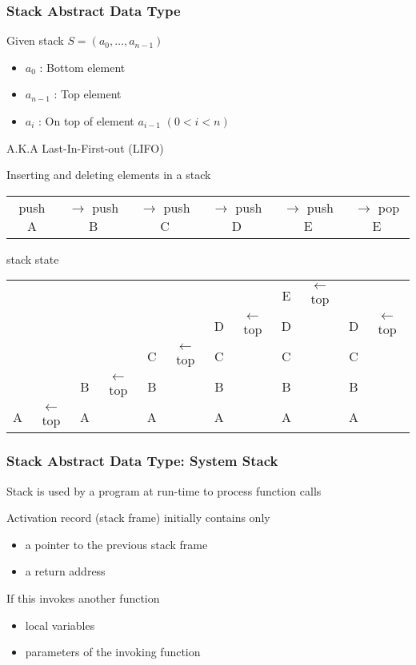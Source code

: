 \documentclass[newPxFont,sthlmFooter,nooffset]{beamer}
\begin{document}
\begin{frame}[t]
  \frametitle{Stack Abstract Data Type}
Given stack $S = ( a_0, \ldots, a_{n-1})$
\begin{itemize}
\item $a_0$ : Bottom element
\item $a_{n-1}$ : Top element
\item $a_{i}$ : On top of element $a_{i-1}$ $(0 < i < n)$
\end{itemize}

A.K.A Last-In-First-out (LIFO)

\bigskip

Inserting and deleting elements in a stack
{\footnotesize  \begin{centering}
\begin{tabular}{!{}c<{}c<{}c<{}c<{}c<{}c}
push A & $\rightarrow$ push B &  $\rightarrow$ push C &  $\rightarrow$ push D &  $\rightarrow$ push E &  $\rightarrow$ pop E \\
    \end{tabular}
  \end{centering}}

{ stack state}

{\footnotesize  \begin{centering}
\begin{tabular}{!{} c<{}c<{}c<{}c<{}c<{}c<{}c<{}c<{}c<{}c<{}c<{}c}
      & &   & &    &  &   &  & E & $\leftarrow$ top &   & \\
      & &   &  &   &  & D & $\leftarrow$ top & D  & & D &  $\leftarrow$ top\\
      & &   &  & C & $\leftarrow$ top & C  & & C & & C &\\
      & & B & $\leftarrow$ top & B & & B & & B & & B &\\
      A & $\leftarrow$ top & A & & A & & A & & A & & A &\\
    \end{tabular}
  \end{centering}}
\end{frame}

\begin{frame}[t]
  \frametitle{Stack Abstract Data Type: System Stack}
Stack is used by a program at run-time to process function calls

Activation record (stack frame) initially contains only 
\begin{itemize}
\item a pointer to the previous stack frame
\item a return address
\end{itemize}
If this invokes another function
\begin{itemize}
\item local variables
\item parameters of the invoking function
\end{itemize}

\end{frame}
\end{document}
